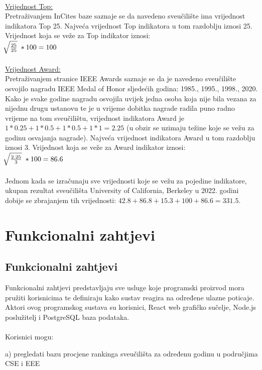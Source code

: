\documentclass[times, utf8, zavrsni]{fer}
\begin{document}
\\ \underline{Vrijednost Top:} 
\\ Pretraživanjem InCites baze saznaje se da navedeno sveučilište ima vrijednost indikatora Top 25. Najveća vrijednost Top indikatora u tom razdoblju iznosi 25.
Vrijednost koja se veže za Top indikator iznosi: \; \\ $\sqrt[\leftroot{-2}]{\frac{25}{25}} \; * 100 = 100$
\\
\\ \underline{Vrijednost Award:} 
\\ Pretraživanjem stranice IEEE Awards saznaje se da je navedeno sveučilište osvojilo nagradu IEEE Medal of Honor sljedećih godina: 1985., 1995., 1998., 2020. Kako je 
svake godine nagradu osvojila uvijek jedna osoba koja nije bila vezana za nijednu drugu ustanovu te je u vrijeme dobitka nagrade
radila puno radno vrijeme na tom sveučilištu, vrijednost 
indikatora Award je $1*0.25+1*0.5+1*0.5+1*1 = 2.25$ (u obzir se uzimaju težine koje se vežu za godinu osvajanja nagrade). Najveća vrijednost 
indikatora Award u tom razdoblju iznosi 3. Vrijednost koja se veže za Award indikator iznosi: \; \\ $\sqrt[\leftroot{-2}]{\frac{2.25}{3}} \; * 100 = 86.6$
\\\\Jednom kada se izračunaju sve vrijednosti koje se vežu za pojedine indikatore,
ukupan rezultat sveučilišta University of California, Berkeley u 2022. godini dobije se zbrajanjem tih vrijednosti: $42.8+86.8+15.3+100+86.6 = 331.5$.

\chapter{Funkcionalni zahtjevi}
\section{Funkcionalni zahtjevi}
Funkcionalni zahtjevi predstavljaju sve usluge koje programski proizvod mora pružiti korisnicima te definiraju kako sustav reagira na određene ulazne poticaje.
\\ Aktori ovog programskog sustava su korisnici, React web grafičko sučelje, Node.js poslužitelj i PostgreSQL baza podataka.
\\
\\Korisnici mogu:

a) pregledati bazu procjene rankinga sveučilišta za određenu godinu u područjima CSE i EEE
\end{document}
